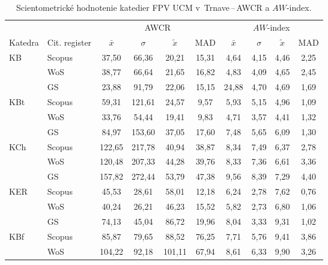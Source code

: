 \begin{table}
  \centering\small
  \caption[Hodnotenie FPV\,--\,AWCR a $AW$-index]{Scientometrické hodnotenie katedier FPV UCM v~Trnave\,--\,AWCR a $AW$-index.}
  \label{tab:5-staff.results}
  \begin{tabularx}{\textwidth}{Xlcccc@{\hspace{3ex}}cccc}
    \toprule\noalign{\vspace{.3ex}}
    & & \multicolumn{4}{c}{AWCR}         & \multicolumn{4}{c}{$AW$-index}  \\
    \cmidrule{3-6}\cmidrule{7-10}
    Katedra & Cit. register & $\bar{x}$ & $\sigma$ & $\tilde{x}$ & MAD & $\bar{x}$ & $\sigma$ & $\tilde{x}$ & MAD \\[0.3ex]
    \midrule\noalign{\vspace{.5ex}}
    KB   & Scopus & 37,50  & 66,36  & 20,21  & 15,31  & 4,64  & 4,15 & 4,46  & 2,25 \\
         & WoS    & 38,77  & 66,64  & 21,65  & 16,82  & 4,83  & 4,09 & 4,65  & 2,45 \\
         & GS     & 23,88  & 91,79  & 22,06  & 15,15  & 24,88 & 4,70 & 4,69  & 1,69 \\[3ex]
    KBt  & Scopus & 59,31  & 121,61 & 24,57  & 9,57   & 5,93  & 5,15 & 4,96  & 1,09 \\
         & WoS    & 33,76  & 54,44  & 19,41  & 9,83   & 4,71  & 3,57 & 4,41  & 1,32 \\
         & GS     & 84,97  & 153,60 & 37,05  & 17,60  & 7,48  & 5,65 & 6,09  & 1,30 \\[3ex]
    KCh  & Scopus & 122,65 & 217,78 & 40,94  & 38,87  & 8,34  & 7,49 & 6,37  & 2,78 \\
         & WoS    & 120,48 & 207,33 & 44,28  & 39,76  & 8,33  & 7,36 & 6,61  & 3,36 \\
         & GS     & 157,82 & 272,44 & 53,79  & 47,38  & 9,56  & 8,39 & 7,29  & 4,40 \\[3ex]
    KER  & Scopus & 45,53  & 28,61  & 58,01  & 12,18  & 6,24  & 2,78 & 7,62  & 0,76 \\
         & WoS    & 40,24  & 26,21  & 46,23  & 15,52  & 5,82  & 2,73 & 6,80  & 1,06 \\
         & GS     & 74,13  & 45,04  & 86,72  & 19,96  & 8,04  & 3,33 & 9,31  & 1,02 \\[3ex]
    KBf  & Scopus & 85,87  & 79,65  & 88,52  & 76,25  & 7,71  & 5,76 & 9,41  & 3,86 \\
         & WoS    & 104,22 & 92,18  & 101,11 & 67,94  & 8,61  & 6,33 & 9,90  & 3,26 \\

\end{tabularx}
\end{table}
